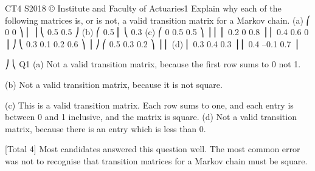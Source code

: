\documentclass[a4paper,12pt]{article}
\begin{document}
CT4 S2018 
© Institute and Faculty of Actuaries1
Explain why each of the following matrices is, or is not, a valid transition matrix for a
Markov chain.
(a) ⎛ 0
0 ⎞
⎜
⎟
⎝ 0.5 0.5 ⎠
(b) ⎛ 0.5
⎜
⎝ 0.3
(c) ⎛ 0 0.5 0.5 ⎞
⎟
⎜
⎜ 0.2 0 0.8 ⎟
⎜ 0.4 0.6 0 ⎟
⎠
⎝
0.3
0.1
0.2
0.6
⎞
⎟
⎠
⎛ 0.5 0.3 0.2 ⎞
⎟
⎜
(d)
⎜ 0.3 0.4 0.3 ⎟
⎜ 0.4 –0.1 0.7 ⎟
				
⎠
⎝
Q1
(a) Not a valid transition matrix,
because the first row sums to 0 not 1. 

(b) Not a valid transition matrix,
because it is not square. 

(c) This is a valid transition matrix. 
Each row sums to one, and each entry is between 0 and 1
inclusive, and the matrix is square. 
(d)
Not a valid transition matrix,
because there is an entry which is less than 0.


[Total 4]
Most candidates answered this question well. The most common
error was not to recognise that transition matrices for a Markov
chain must be square.
\end{document}
